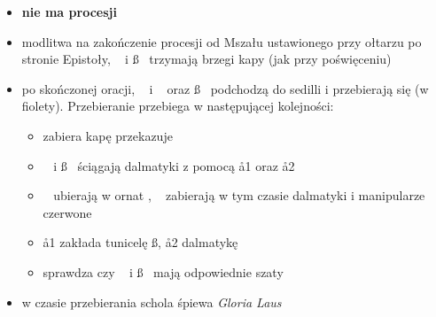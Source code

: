 \begin{itemize}
	\item \textbf{nie ma procesji}
	\item modlitwa na zakończenie procesji od Mszału ustawionego przy ołtarzu po
	      stronie Epistoły, \dd~ i \ss~ trzymają brzegi kapy (jak przy poświęceniu)
	\item po skończonej oracji, \ii~ i \dd~ oraz \ss~ podchodzą do sedilli i
	      przebierają się (w {\color{violet}fiolety}). Przebieranie przebiega w
	      następującej kolejności:

	      \begin{itemize}
		      \item {} zabiera kapę przekazuje \zz
		      \item \dd~ i \ss~ ściągają dalmatyki z pomocą \aa1 oraz \aa2
		      \item \cc\cc~ ubierają w ornat \ii, \zz\zz~ zabierają w tym
		            czasie dalmatyki i manipularze czerwone
		      \item \aa1 zakłada tunicelę \ss, \aa2 dalmatykę \dd
		      \item {} sprawdza czy \dd~ i \ss~ mają odpowiednie szaty
	      \end{itemize}

	\item w czasie przebierania schola śpiewa \textit{Gloria Laus}
\end{itemize}
